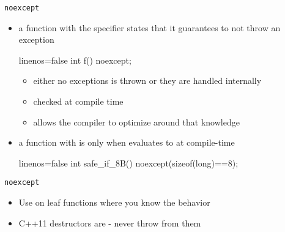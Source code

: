 \begin{frame}[fragile]
  \begin{block}{\texttt{noexcept}}
    \begin{itemize}
      \item a function with the  specifier states that it guarantees to not throw an exception
      \begin{cppcode*}{linenos=false}
        int f() noexcept;
      \end{cppcode*}
      \begin{itemize}
        \item either no exceptions is thrown or they are handled internally
        \item checked at compile time
        \item allows the compiler to optimize around that knowledge
      \end{itemize}
      \item a function with  is only  when  evaluates to  at compile-time
      \begin{cppcode*}{linenos=false}
        int safe_if_8B() noexcept(sizeof(long)==8);
      \end{cppcode*}
    \end{itemize}
  \end{block}
  \begin{goodpractice}{\texttt{noexcept}}
    \begin{itemize}
      \item Use  on leaf functions where you know the behavior
      \item C++11 destructors are  - never throw from them
    \end{itemize}
  \end{goodpractice}
\end{frame}

